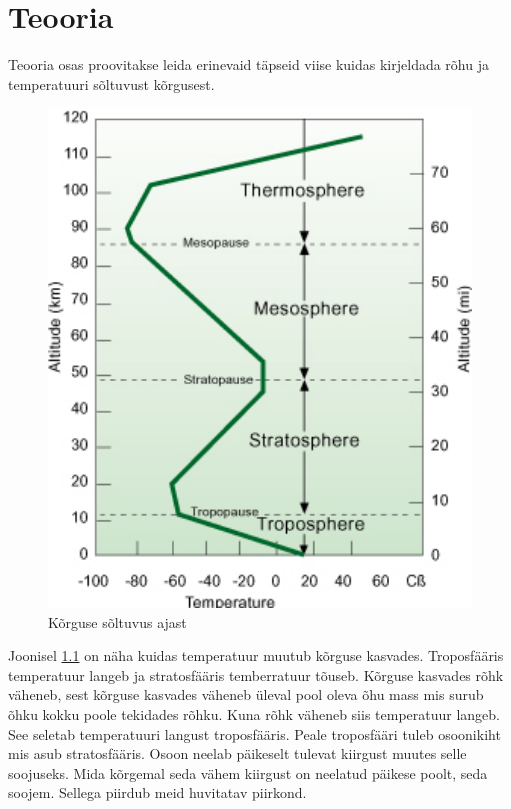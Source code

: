 \documentclass{trkut}%
\begin{document}
\maketitle%
\tableofcontents%

\nummerdame%


\chapter{Teooria}
Teooria osas proovitakse leida erinevaid täpseid viise kuidas kirjeldada rõhu ja temperatuuri sõltuvust kõrgusest. 

\begin{figure}[h]
	\includegraphics[width=1\textwidth]{profile.png}
	\caption{Kõrguse sõltuvus ajast}
	\label{profile}%
\end{figure}

Joonisel \ref{profile} on näha kuidas temperatuur muutub kõrguse kasvades. Troposfääris temperatuur langeb ja stratosfääris temberratuur tõuseb. Kõrguse kasvades rõhk väheneb, sest kõrguse kasvades väheneb üleval pool oleva õhu mass mis surub õhku kokku poole tekidades rõhku. Kuna rõhk väheneb siis temperatuur langeb. See seletab temperatuuri langust troposfääris. Peale troposfääri tuleb osoonikiht mis asub stratosfääris. Osoon neelab päikeselt tulevat kiirgust muutes selle soojuseks. Mida kõrgemal seda vähem kiirgust on neelatud päikese poolt, seda soojem. Sellega piirdub meid huvitatav piirkond.
\end{document}
